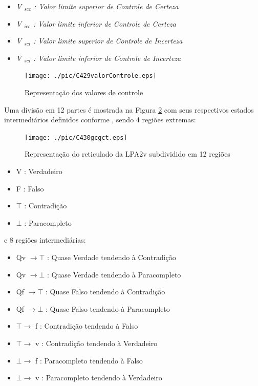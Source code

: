 \begin{itemize}
\item \emph{V $_{scc}$ : Valor limite superior de Controle de Certeza}
\item \emph{V $_{icc}$ : Valor limite inferior de Controle de Certeza}
\item \emph{V $_{sci}$ : Valor limite superior de Controle de Incerteza}
\item \emph{V $_{sci}$ : Valor limite inferior de Controle de Incerteza}

\end{itemize}

\begin{figure}[!htb]
\center\texttt{[image: ./pic/C429valorControle.eps]}
\caption{Representação dos valores de controle}
\label{fig:valorControle}
\end{figure}

Uma divisão em 12 partes é mostrada na Figura \ref{fig:reticuladoLPA2v} com seus respectivos estados intermediários definidos conforme \cite{JoaoInacio}, sendo 4 regiões extremas:


\begin{figure}[!htb]
\center\texttt{[image: ./pic/C430gcgct.eps]}
\caption{Representação do reticulado da LPA2v subdividido em 12 regiões}
\label{fig:reticuladoLPA2v}
\end{figure}


\begin{itemize}
\item V : Verdadeiro
\item F : Falso
\item $\top$ : Contradição
\item $\bot$ : Paracompleto
\end{itemize}
e 8 regiões intermediárias: 
\begin{itemize}
\item Qv $\rightarrow  \top$ : Quase Verdade tendendo à Contradição
\item Qv $\rightarrow  \bot$ : Quase Verdade tendendo à  Paracompleto
\item Qf $\rightarrow  \top$ : Quase Falso tendendo à Contradição
\item Qf $\rightarrow  \bot$ : Quase Falso tendendo à Paracompleto
\item $\top \rightarrow $ f : Contradição tendendo à Falso
\item $\top \rightarrow $ v : Contradição tendendo à Verdadeiro
\item $\bot \rightarrow $ f : Paracompleto tendendo à Falso
\item $\bot \rightarrow $ v : Paracompleto tendendo à Verdadeiro

\end{itemize}


